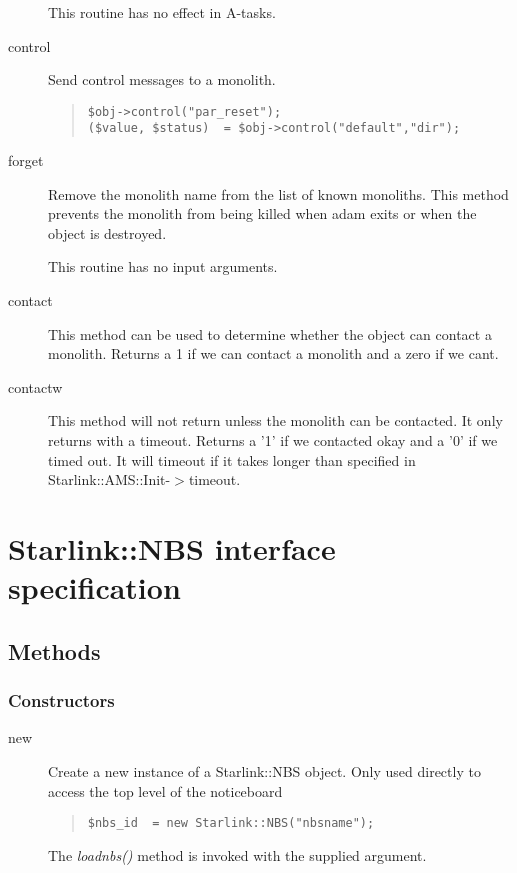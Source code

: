 \documentclass[twoside,11pt]{article}
\newenvironment{myquote}{\begin{quote}\begin{small}}{\end{small}\end{quote}}
\renewcommand{\_}{\texttt{\symbol{95}}}
\begin{document}
\begin{description}
This routine has no effect in A-tasks.

\item[control] \mbox{}

Send control messages to a monolith.
\begin{myquote}
\begin{verbatim}
$obj->control("par_reset");
($value, $status)  = $obj->control("default","dir");
\end{verbatim}
\end{myquote} %

\item[forget] \mbox{}

Remove the monolith name from the list of known monoliths.
This method prevents the monolith from being killed when adam
exits or when the object is destroyed.

This routine has no input arguments. 

\item[contact] \mbox{}

This method can be used to determine whether the object can
contact a monolith. Returns a 1 if we can contact a monolith and
a zero if we cant.

\item[contactw] \mbox{}

This method will not return unless the monolith can be contacted.
It only returns with a timeout. Returns a '1' if we contacted okay
and a '0' if we timed out. It will timeout if it takes longer than
specified in Starlink::AMS::Init-$>$timeout.

\end{description}

\section{Starlink::NBS interface specification}

\subsection{Methods}

\subsubsection*{Constructors}%

\begin{description}

\item[new] \mbox{}

Create a new instance of a Starlink::NBS object.
Only used directly to access the top level of the noticeboard
\begin{myquote}
\begin{verbatim}
$nbs_id  = new Starlink::NBS("nbsname");
\end{verbatim}
\end{myquote} %

The {\em loadnbs()\/} method is invoked with the supplied argument.

\end{description}
\end{document}
